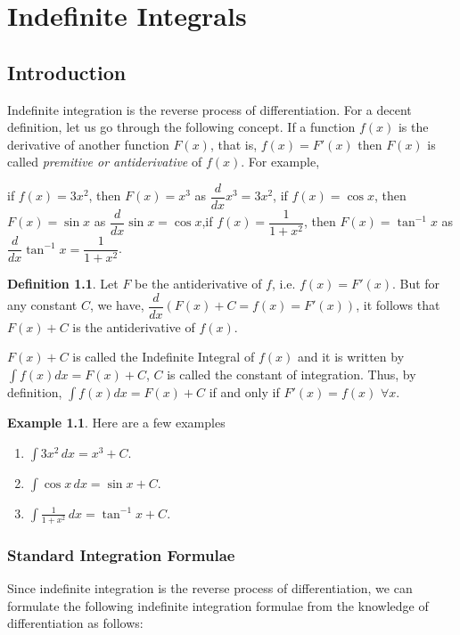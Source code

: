 \documentclass{book}
\theoremstyle{definition}
\newtheorem{definition}{Definition}[section]
\newtheorem{example}{Example}[section]
\begin{document}
\chapter{Indefinite Integrals}

\section {Introduction}
\vspace{0.2 cm}
Indefinite integration is the reverse process of differentiation. For a decent definition, let us go through the following concept. If a function $f(x)$ is the derivative of another function $F(x)$, that is, $f(x)=F'(x)$ then $F(x)$ is called \textit{premitive or antiderivative} of $f(x)$. For example,

if $f(x)=3x^2$, then $F(x)=x^3$ as $\dfrac{d}{dx}x^3=3x^2$, if $f(x)=\cos x$, then $F(x)=\sin x$ as $\dfrac{d}{dx}\sin x=\cos x$,if $f(x)=\dfrac{1}{1+x^2}$, then $F(x)=\tan^{-1} x$ as $\dfrac{d}{dx}\tan^{-1}x=\dfrac{1}{1+x^2}$.

\begin{definition}
Let $F$ be the antiderivative of $f$, i.e. $f(x)=F'(x)$. But for any constant $C$, we have, $\dfrac{d}{dx}(F(x)+C=f(x)=F'(x))$, it follows that $F(x)+C$ is the antiderivative of  $f(x)$.

$F(x)+C$ is called the Indefinite Integral of $f(x)$ and it is written by $\displaystyle\int f(x)dx=F(x)+C$, $C$ is called the constant of integration. Thus, by definition, $\displaystyle\int f(x)dx =F(x)+C$ if and only if $F'(x)=f(x)$ $\forall x$.    
\end{definition}


\begin{example}
Here are a few examples
\begin{enumerate}[label=(\roman*)]
    \item $\displaystyle\int3x^2 \, dx=x^3+C$.
    \item $\displaystyle\int \cos x \, dx=\sin x+C$.
    \item $\displaystyle\int \frac{1}{1+x^2} \, dx=\tan^{-1}x+C$.
\end{enumerate}
\end{example}


\subsection{Standard Integration Formulae}

Since indefinite integration is the reverse process of differentiation, we can formulate the following indefinite integration formulae from the knowledge of differentiation as follows:
\end{document}
